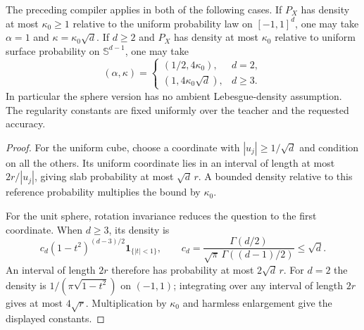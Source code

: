 \begin{corollary}
\label{cor:digital-cube-sphere}
The preceding compiler applies in both of the following cases.
If $P_X$ has density at most $\kappa_0\ge1$ relative to the uniform
probability law on $[-1,1]^d$, one may take
$\alpha=1$ and $\kappa=\kappa_0\sqrt d$.
If $d\ge2$ and $P_X$ has density at most $\kappa_0$ relative to
uniform surface probability on $\mathbb S^{d-1}$, one may take
\[
 (\alpha,\kappa)=
 \begin{cases}
 (1/2,4\kappa_0),&d=2,\\
 (1,4\kappa_0\sqrt d),&d\ge3.
 \end{cases}
\]
In particular the sphere version has no ambient Lebesgue-density
assumption. The regularity constants are fixed uniformly over the
teacher and the requested accuracy.
\end{corollary}
\begin{proof}
For the uniform cube, choose a coordinate with
$|u_j|\ge1/\sqrt d$ and condition on all the others. Its uniform
coordinate lies in an interval of length at most $2r/|u_j|$,
giving slab probability at most $\sqrt d\,r$. A bounded density
relative to this reference probability multiplies the bound by
$\kappa_0$.

For the unit sphere, rotation invariance reduces the question to
the first coordinate. When $d\ge3$, its density is
\[
 c_d(1-t^2)^{(d-3)/2}\mathbf1_{\{|t|<1\}},\qquad
 c_d=\frac{\Gamma(d/2)}{\sqrt\pi\,\Gamma((d-1)/2)}\le\sqrt d.
\]
An interval of length $2r$ therefore has probability at most
$2\sqrt d\,r$. For $d=2$ the density is
$1/(\pi\sqrt{1-t^2})$ on $(-1,1)$; integrating over any interval
of length $2r$ gives at most $4\sqrt r$.
Multiplication by $\kappa_0$ and harmless enlargement give the
displayed constants.
\end{proof}
